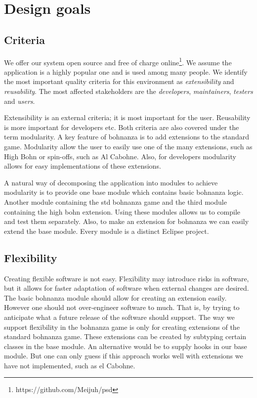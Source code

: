 \section{Design goals}
\subsection{Criteria}\label{ssec:criteria}
We offer our system open source and free of charge online\footnote{https://github.com/Meijuh/psd}. We assume the application is a highly
popular one and is used among many people. We identify the most important quality criteria for this
environment as \emph{extensibility} and \emph{reusability}. The most affected stakeholders are the
\emph{developers}, \emph{maintainers}, \emph{testers} and \emph{users}.

Extensibility is an external criteria; it is most important for the user. Reusability is more
important for developers etc. Both criteria are also covered under the term modularity. A key
feature of bohnanza is to add extensions to the standard game. Modularity allow the user to easily use one of the many extensions, such
as High Bohn or spin-offs, such as Al Cabohne. Also, for developers modularity allows for easy implementations of these extensions.

A natural way of decomposing the application into modules to achieve modularity is to provide one base module which contains basic bohnanza
logic. Another module containing the std bohnanza game and the third module containing the high bohn extension. Using these modules allows us to
compile and test them separately. Also, to make an extension for bohnanza we can easily extend the base module. Every module is a distinct Eclipse
project.
 
\subsection{Flexibility}\label{ssec:flexibility}
Creating flexible software is not easy. Flexibility may introduce risks in software, but it allows for faster adaptation of software when
external changes are desired. The basic bohnanza module should allow for creating an extension easily. However one should not over-engineer
software to much. That is, by trying to anticipate what a future release of the software should support. The way we support flexibility in
the bohnanza game is only for creating extensions of the standard bohnanza game. These extensions can be created by subtyping certain
classes in the base module. An alternative would be to supply hooks in our base module. But one can only
guess if this approach works well with extensions we have not implemented, such as el Cabohne. 

